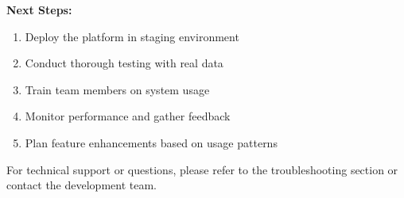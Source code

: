 \documentclass[12pt,a4paper]{article}
\begin{document}
\textbf{Next Steps:}
\begin{enumerate}
    \item Deploy the platform in staging environment
    \item Conduct thorough testing with real data
    \item Train team members on system usage
    \item Monitor performance and gather feedback
    \item Plan feature enhancements based on usage patterns
\end{enumerate}

For technical support or questions, please refer to the troubleshooting section or contact the development team.
\end{document}
